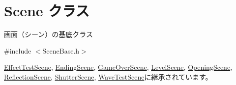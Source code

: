 \hypertarget{class_scene}{}\section{Scene クラス}
\label{class_scene}


画面（シーン）の基底クラス 




{\ttfamily \#include $<$Scene\+Base.\+h$>$}



\hyperlink{class_effect_test_scene}{Effect\+Test\+Scene}, \hyperlink{class_ending_scene}{Ending\+Scene}, \hyperlink{class_game_over_scene}{Game\+Over\+Scene}, \hyperlink{class_level_scene}{Level\+Scene}, \hyperlink{class_opening_scene}{Opening\+Scene}, \hyperlink{class_reflection_scene}{Reflection\+Scene}, \hyperlink{class_shutter_scene}{Shutter\+Scene}, \hyperlink{class_wave_test_scene}{Wave\+Test\+Scene}に継承されています。

